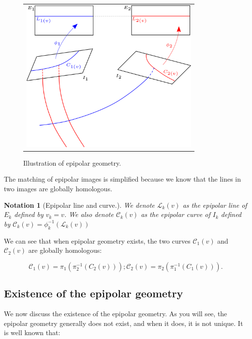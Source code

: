 \documentclass{ipol}
\newcommand{\PiOT}[1]{\pi_1(\pi_2^{-1}(#1))}
\newcommand{\PiTO}[1]{\pi_2(\pi_1^{-1}(#1))}
\newcommand{\LineE}[1]{\ensuremath{\mathcal{L}_{#1}}}
\newcommand{\LineK}{\LineE{k}}
\newcommand{\CurveE}[1]{\ensuremath{\mathcal{C}_{#1}}}
\newcommand{\CurveO}{\CurveE{1}}
\newcommand{\CurveT}{\CurveE{2}}
\newcommand{\CurveK}{\CurveE{k}}
\newtheorem{notation}{Notation}
\newcommand{\er}[1]{\textcolor{orange}{#1}}
\begin{document}
\begin{figure}
\centering
\begin{tabular}{c}
\includegraphics[width=9cm]{FIGS/Epip.png} 
\end{tabular}
\caption{Illustration of epipolar geometry.}
\label{FigDefEpip}
\end{figure}


\noindent The matching of epipolar images is simplified because we know that the lines in two images are globally homologous. 


\begin{notation}[Epipolar line and curve.]
We denote $\LineK(v)$  as the epipolar  line of $E_k$ defined by $v_k=v$. We also denote $\CurveK(v)$ as the epipolar
curve of $I_k$ defined by $\CurveK(v) = \phi_k^{-1}(\LineK(v))$
\end{notation}
%
\noindent We can see that when epipolar geometry exists, the two curves $\CurveO(v)$ and $\CurveT(v)$ are globally homologous:

\begin{equation}
     \CurveO(v) = \PiOT{C_2(v)}   ;  \CurveT(v) = \PiTO{C_1(v)}.\label{Eq:CurvHom}
\end{equation}



\subsection{Existence of the epipolar geometry}\label{ExistEpip} 

We now discuss the existence of the {epipolar geometry}. As you will see, the epipolar geometry generally does not exist, and when it does, it is not
unique. It is well known that:
\end{document}
